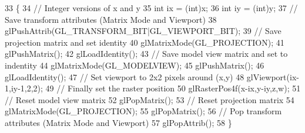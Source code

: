 \begin{DoxyCode}
33 \{
34    \textcolor{comment}{//  Integer versions of x and y}
35    \textcolor{keywordtype}{int} ix = (int)x;
36    \textcolor{keywordtype}{int} iy = (int)y;
37    \textcolor{comment}{//  Save transform attributes (Matrix Mode and Viewport)}
38    glPushAttrib(GL\_TRANSFORM\_BIT|GL\_VIEWPORT\_BIT);
39    \textcolor{comment}{//  Save projection matrix and set identity}
40    glMatrixMode(GL\_PROJECTION);
41    glPushMatrix();
42    glLoadIdentity();
43    \textcolor{comment}{//  Save model view matrix and set to indentity}
44    glMatrixMode(GL\_MODELVIEW);
45    glPushMatrix();
46    glLoadIdentity();
47    \textcolor{comment}{//  Set viewport to 2x2 pixels around (x,y)}
48    glViewport(ix-1,iy-1,2,2);
49    \textcolor{comment}{//  Finally set the raster position}
50    glRasterPos4f(x-ix,y-iy,z,w);
51    \textcolor{comment}{//  Reset model view matrix}
52    glPopMatrix();
53    \textcolor{comment}{//  Reset projection matrix}
54    glMatrixMode(GL\_PROJECTION);
55    glPopMatrix();
56    \textcolor{comment}{//  Pop transform attributes (Matrix Mode and Viewport)}
57    glPopAttrib();
58 \}
\end{DoxyCode}


